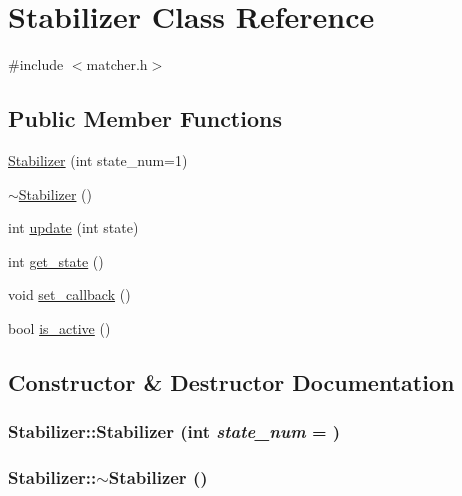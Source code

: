 \hypertarget{class_stabilizer}{
\section{Stabilizer Class Reference}
\label{class_stabilizer}
}


{\ttfamily \#include $<$matcher.h$>$}

\subsection*{Public Member Functions}
\begin{DoxyCompactItemize}
\item 
\hyperlink{class_stabilizer_a01fab16649255b634440c59fdaaef818}{Stabilizer} (int state\_\-num=1)
\item 
\hyperlink{class_stabilizer_a4ce647343b82fd5ef942407a13fc748a}{$\sim$Stabilizer} ()
\item 
int \hyperlink{class_stabilizer_af417ac1f22ed249d6dbd878a0d6e7907}{update} (int state)
\item 
int \hyperlink{class_stabilizer_ad0997d0f6d19288c0f00f1ec490b7efd}{get\_\-state} ()
\item 
void \hyperlink{class_stabilizer_a07ef8a0a3c59271b0fe271af0807c6c2}{set\_\-callback} ()
\item 
bool \hyperlink{class_stabilizer_accffa026250013a4023fb2594bc74a31}{is\_\-active} ()
\end{DoxyCompactItemize}


\subsection{Constructor \& Destructor Documentation}
\hypertarget{class_stabilizer_a01fab16649255b634440c59fdaaef818}{
\subsubsection[{Stabilizer}]{\setlength{\rightskip}{0pt plus 5cm}Stabilizer::Stabilizer (int {\em state\_\-num} = {})}}
\label{class_stabilizer_a01fab16649255b634440c59fdaaef818}
\hypertarget{class_stabilizer_a4ce647343b82fd5ef942407a13fc748a}{
\subsubsection[{$\sim$Stabilizer}]{\setlength{\rightskip}{0pt plus 5cm}Stabilizer::$\sim$Stabilizer ()}}
\label{class_stabilizer_a4ce647343b82fd5ef942407a13fc748a}


